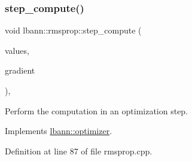 \subsubsection{\texorpdfstring{step\+\_\+compute()}{step\_compute()}}
{\footnotesize\ttfamily void lbann\+::rmsprop\+::step\+\_\+compute (\begin{DoxyParamCaption}\item[{\hyperlink{base_8hpp_a9a697a504ae84010e7439ffec862b470}{Abs\+Dist\+Mat} \&}]{values,  }\item[{const \hyperlink{base_8hpp_a9a697a504ae84010e7439ffec862b470}{Abs\+Dist\+Mat} \&}]{gradient }\end{DoxyParamCaption})\hspace{0.3cm}{\ttfamily [override]}, {\ttfamily [virtual]}}

Perform the computation in an optimization step. 

Implements \hyperlink{classlbann_1_1optimizer_a0db72c298a0bc3405fb0af97d104a036}{lbann\+::optimizer}.



Definition at line 87 of file rmsprop.\+cpp.


